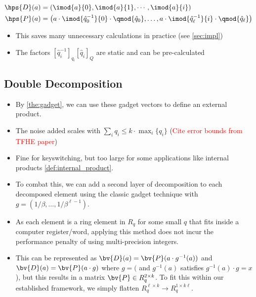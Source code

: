 \begin{align}
    \hps{D}(a) &= \left( \imod{a}{0}, \imod{a}{1}, \cdots, \imod{a}{i}\right)\\
    \hps{P}(a) &= \left( a\cdot\imod{\hat{q}_0^{-1}}{0} \cdot \qmod{\hat{q}_0}, \dots, a\cdot\imod{\hat{q}_\ell^{-1}}{i} \cdot \qmod{\hat{q}_\ell} \right)
\end{align}

\begin{itemize}
    \item This saves many unnecessary calculations in practice (see \autoref{sec:impl})
    \item The factors $[\hat{q}_i^{-1}]_{q_i} [\hat{q}_i]_{Q}$ are static and can be pre-calculated
\end{itemize}

\subsection{Double Decomposition}
\begin{itemize}
    \item By \autoref{the:gadget}, we can use these gadget vectors to define an external product. 
    \item The noise added scales with $\sum_{i}q_i \leq k\cdot \max_i\{q_i\}$ (\textcolor{red}{Cite error bounds from TFHE paper}) 
    \item Fine for keyswitching, but too large for some applications like internal products \eqref{def:internal_product}.
    \item To combat this, we can add a second layer of decomposition to each decomposed element using the classic gadget technique with $g = (1/\beta, \dots,1/\beta^{\ell-1})$.
    \item As each element is a ring element in $R_{q}$ for some small $q$ that fits inside a computer register/word, applying this method does not incur the performance penalty of using multi-precision integers.
    \item This can be represented as $\bv{D}(a) = \bv{P}(a\cdot g^{-1}(a))$ and $\bv{D}(a) = \bv{P}(a\cdot g)$ where $g = ($ and $g^{-1}(a)$ satisfies $g^{-1}(a)\cdot g = x$), but this results in a matrix $\bv{P}\in R^{2\times k}_q$. To fit this within our established framework, we simply flatten $R^{\ell\times k}_q \to R^{1\times k\ell}_q$.
\end{itemize}

